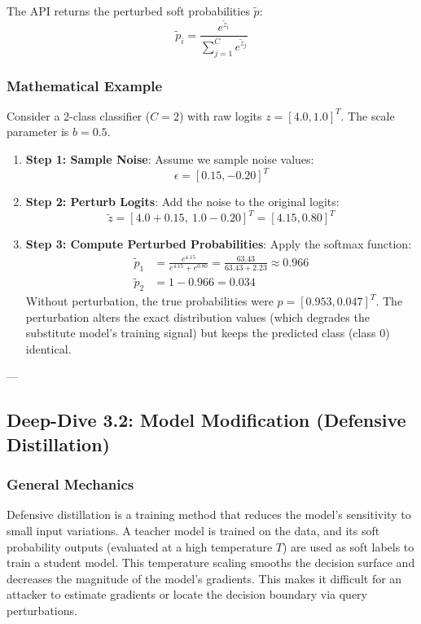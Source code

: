 \documentclass{article}
\begin{document}
The API returns the perturbed soft probabilities $\tilde{p}$:
\begin{equation}
    \tilde{p}_i = \frac{e^{\tilde{z}_i}}{\sum_{j=1}^C e^{\tilde{z}_j}}
\end{equation}

\subsubsection{Mathematical Example}
Consider a 2-class classifier ($C=2$) with raw logits $z = [4.0, 1.0]^T$. The scale parameter is $b = 0.5$.
\begin{enumerate}
    \item \textbf{Step 1: Sample Noise}: Assume we sample noise values:
    $$\epsilon = [0.15, -0.20]^T$$
    
    \item \textbf{Step 2: Perturb Logits}: Add the noise to the original logits:
    $$\tilde{z} = [4.0 + 0.15, \ 1.0 - 0.20]^T = [4.15, 0.80]^T$$
    
    \item \textbf{Step 3: Compute Perturbed Probabilities}: Apply the softmax function:
    \begin{align*}
        \tilde{p}_1 &= \frac{e^{4.15}}{e^{4.15} + e^{0.80}} = \frac{63.43}{63.43 + 2.23} \approx 0.966 \\
        \tilde{p}_2 &= 1 - 0.966 = 0.034
    \end{align*}
    Without perturbation, the true probabilities were $p = [0.953, 0.047]^T$. The perturbation alters the exact distribution values (which degrades the substitute model's training signal) but keeps the predicted class (class 0) identical.
\end{enumerate}

---

\subsection{Deep-Dive 3.2: Model Modification (Defensive Distillation)}

\subsubsection{General Mechanics}
Defensive distillation is a training method that reduces the model's sensitivity to small input variations. A teacher model is trained on the data, and its soft probability outputs (evaluated at a high temperature $T$) are used as soft labels to train a student model. This temperature scaling smooths the decision surface and decreases the magnitude of the model's gradients. This makes it difficult for an attacker to estimate gradients or locate the decision boundary via query perturbations.
\end{document}
